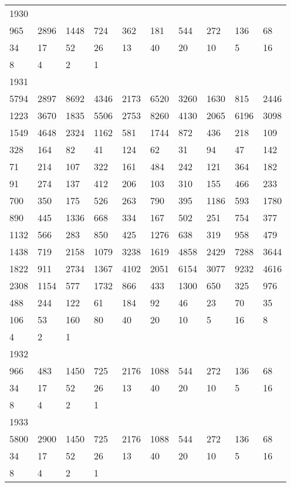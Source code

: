 \begin{longtable}{*{10}{l}}
1930&&&&&&&&&\\
965& 2896& 1448& 724& 362& 181& 544& 272& 136& 68\\
34& 17& 52& 26& 13& 40& 20& 10& 5& 16\\
8& 4& 2& 1& \\

1931&&&&&&&&&\\
5794& 2897& 8692& 4346& 2173& 6520& 3260& 1630& 815& 2446\\
1223& 3670& 1835& 5506& 2753& 8260& 4130& 2065& 6196& 3098\\
1549& 4648& 2324& 1162& 581& 1744& 872& 436& 218& 109\\
328& 164& 82& 41& 124& 62& 31& 94& 47& 142\\
71& 214& 107& 322& 161& 484& 242& 121& 364& 182\\
91& 274& 137& 412& 206& 103& 310& 155& 466& 233\\
700& 350& 175& 526& 263& 790& 395& 1186& 593& 1780\\
890& 445& 1336& 668& 334& 167& 502& 251& 754& 377\\
1132& 566& 283& 850& 425& 1276& 638& 319& 958& 479\\
1438& 719& 2158& 1079& 3238& 1619& 4858& 2429& 7288& 3644\\
1822& 911& 2734& 1367& 4102& 2051& 6154& 3077& 9232& 4616\\
2308& 1154& 577& 1732& 866& 433& 1300& 650& 325& 976\\
488& 244& 122& 61& 184& 92& 46& 23& 70& 35\\
106& 53& 160& 80& 40& 20& 10& 5& 16& 8\\
4& 2& 1& \\

1932&&&&&&&&&\\
966& 483& 1450& 725& 2176& 1088& 544& 272& 136& 68\\
34& 17& 52& 26& 13& 40& 20& 10& 5& 16\\
8& 4& 2& 1& \\

1933&&&&&&&&&\\
5800& 2900& 1450& 725& 2176& 1088& 544& 272& 136& 68\\
34& 17& 52& 26& 13& 40& 20& 10& 5& 16\\
8& 4& 2& 1& \\


\end{longtable}
